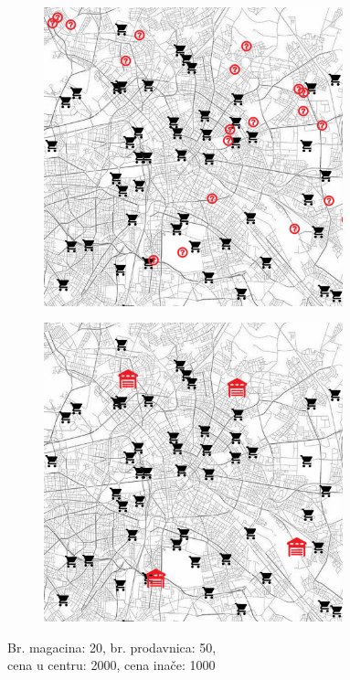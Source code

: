 \documentclass[a4paper]{article}
\begin{document}
\begin{figure}[H]
\centering
\begin{subfigure}{.5\textwidth}
    \centering
    \includegraphics[width=0.95\textwidth]{pics/candidates1.png}
\end{subfigure}%
\begin{subfigure}{.5\textwidth}
    \centering
    \includegraphics[width=0.95\textwidth]{pics/final1.png}
\end{subfigure}
\caption[long]{Br. magacina: 20, br. prodavnica: 50,\\ cena u centru: 2000, cena inače: 1000}
\end{figure}
\end{document}
